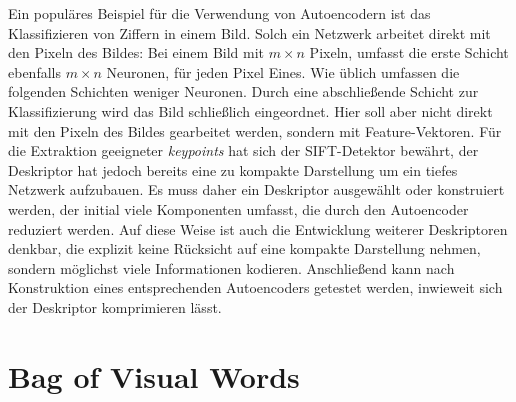 Ein populäres Beispiel für die Verwendung von Autoencodern ist das Klassifizieren von Ziffern in einem Bild. Solch ein Netzwerk arbeitet direkt mit den Pixeln des Bildes: Bei einem Bild mit $m \times n$ Pixeln, umfasst die erste Schicht ebenfalls $m \times n$ Neuronen, für jeden Pixel Eines. Wie üblich umfassen die folgenden Schichten weniger Neuronen. Durch eine abschließende Schicht zur Klassifizierung wird das Bild schließlich eingeordnet. Hier soll aber nicht direkt mit den Pixeln des Bildes gearbeitet werden, sondern mit Feature-Vektoren. Für die Extraktion geeigneter \textit{keypoints} hat sich der SIFT-Detektor bewährt, der Deskriptor hat jedoch bereits eine zu kompakte Darstellung um ein tiefes Netzwerk aufzubauen. Es muss daher ein Deskriptor ausgewählt oder konstruiert werden, der initial viele Komponenten umfasst, die durch den Autoencoder reduziert werden. Auf diese Weise ist auch die Entwicklung weiterer Deskriptoren denkbar, die explizit keine Rücksicht auf eine kompakte Darstellung nehmen, sondern möglichst viele Informationen kodieren. Anschließend kann nach Konstruktion eines entsprechenden Autoencoders getestet werden, inwieweit sich der Deskriptor komprimieren lässt.

\section{Bag of Visual Words}

